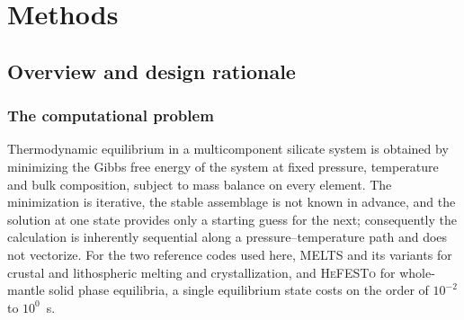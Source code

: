 %
%
%

\section{Methods}
\label{sec:ngibbs-methods}

\subsection{Overview and design rationale}
\label{sec:overview}

\subsubsection{The computational problem}

Thermodynamic equilibrium in a multicomponent silicate system is obtained by
minimizing the Gibbs free energy of the system at fixed pressure, temperature and
bulk composition, subject to mass balance on every element. The minimization is
iterative, the stable assemblage is not known in advance, and the solution at one
state provides only a starting guess for the next; consequently the calculation is
inherently sequential along a pressure--temperature path and does not vectorize.
For the two reference codes used here, \textsc{MELTS} and its variants
\citep{Ghiorso1995,Asimow1998,Ghiorso2002} for crustal and lithospheric melting and
crystallization, and \textsc{HeFESTo} \citep{StixrudeLithgowBertelloni2005,
StixrudeLithgowBertelloni2011,StixrudeLithgowBertelloni2022} for whole-mantle solid phase equilibria,
a single equilibrium state costs on the order of
$10^{-2}$ to $10^{0}$~s.

